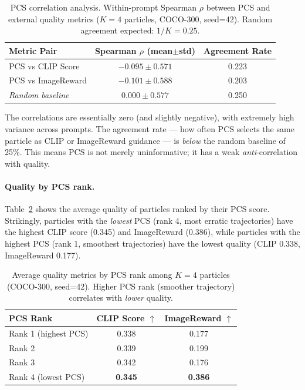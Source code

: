 \documentclass{article}
\newcommand{\pcs}{\textsc{PCS}}
\begin{document}
\begin{table}[t]
\centering
\caption{\pcs{} correlation analysis. Within-prompt Spearman $\rho$ between \pcs{} and external quality metrics ($K=4$ particles, COCO-300, seed=42). Random agreement expected: $1/K = 0.25$.}
\label{tab:pcs_correlation}
\small
\begin{tabular}{lcc}
\toprule
Metric Pair & Spearman $\rho$ (mean$\pm$std) & Agreement Rate \\
\midrule
\pcs{} vs CLIP Score & $-0.095 \pm 0.571$ & 0.223 \\
\pcs{} vs ImageReward & $-0.101 \pm 0.588$ & 0.203 \\
\midrule
\textit{Random baseline} & $0.000 \pm 0.577$ & 0.250 \\
\bottomrule
\end{tabular}
\end{table}

The correlations are essentially zero (and slightly negative), with extremely high variance across prompts. The agreement rate --- how often \pcs{} selects the same particle as CLIP or ImageReward guidance --- is \emph{below} the random baseline of 25\%. This means \pcs{} is not merely uninformative; it has a weak \emph{anti}-correlation with quality.

\paragraph{Quality by \pcs{} rank.} Table~\ref{tab:pcs_rank} shows the average quality of particles ranked by their \pcs{} score. Strikingly, particles with the \emph{lowest} \pcs{} (rank 4, most erratic trajectories) have the highest CLIP score (0.345) and ImageReward (0.386), while particles with the highest \pcs{} (rank 1, smoothest trajectories) have the lowest quality (CLIP 0.338, ImageReward 0.177).

\begin{table}[t]
\centering
\caption{Average quality metrics by \pcs{} rank among $K=4$ particles (COCO-300, seed=42). Higher \pcs{} rank (smoother trajectory) correlates with \emph{lower} quality.}
\label{tab:pcs_rank}
\small
\begin{tabular}{lcc}
\toprule
\pcs{} Rank & CLIP Score $\uparrow$ & ImageReward $\uparrow$ \\
\midrule
Rank 1 (highest \pcs{}) & 0.338 & 0.177 \\
Rank 2 & 0.339 & 0.199 \\
Rank 3 & 0.342 & 0.176 \\
Rank 4 (lowest \pcs{}) & \textbf{0.345} & \textbf{0.386} \\
\bottomrule
\end{tabular}
\end{table}
\end{document}
